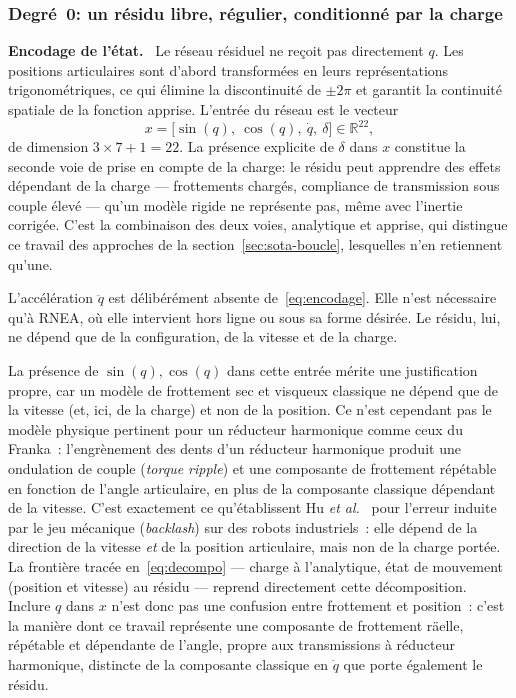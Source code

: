 \documentclass[a4paper, oneside]{article}
\newcommand{\parag}[1]{%
    \par\medskip\noindent\textbf{#1}\ \ignorespaces%
}
\newcommand{\q}{\ensuremath{q}}
\newcommand{\qd}{\ensuremath{\dot{q}}}
\newcommand{\qdd}{\ensuremath{\ddot{q}}}
\newcommand{\Rset}{\ensuremath{\mathbb{R}}}
\begin{document}
\subsubsection{Degré~0: un résidu libre, régulier, conditionné par la charge}
\label{sec:degre0}

\parag{Encodage de l'état.} Le réseau résiduel ne reçoit pas directement
$\q$. Les positions articulaires sont d'abord transformées en leurs
représentations trigonométriques, ce qui élimine la discontinuité de
$\pm 2\pi$ et garantit la continuité spatiale de la fonction apprise. L'entrée
du réseau est le vecteur
%
\begin{equation}
    x = \bigl[\sin(\q),\ \cos(\q),\ \qd,\ \delta\bigr] \in \Rset^{22},
    \label{eq:encodage}
\end{equation}
%
de dimension $3\times 7 + 1 = 22$. La présence explicite de $\delta$ dans $x$
constitue la seconde voie de prise en compte de la charge: le résidu peut
apprendre des effets dépendant de la charge — frottements chargés, compliance de
transmission sous couple élevé — qu'un modèle rigide ne représente pas, même
avec l'inertie corrigée. C'est la combinaison des deux voies, analytique et
apprise, qui distingue ce travail des approches de la
section~\ref{sec:sota-boucle}, lesquelles n'en retiennent qu'une.

L'accélération $\qdd$ est délibérément absente de~\eqref{eq:encodage}. Elle
n'est nécessaire qu'à RNEA, où elle intervient hors ligne ou sous sa forme
désirée. Le résidu, lui, ne dépend que de la configuration, de la vitesse et de
la charge.

La présence de $\sin(\q), \cos(\q)$ dans cette entrée mérite une justification
propre, car un modèle de frottement sec et visqueux classique ne dépend que de
la vitesse (et, ici, de la charge) et non de la position. Ce n'est cependant
pas le modèle physique pertinent pour un réducteur harmonique comme ceux du
Franka~: l'engrènement des dents d'un réducteur harmonique produit une
ondulation de couple (\emph{torque ripple}) et une composante de frottement
répétable en fonction de l'angle articulaire, en plus de la composante
classique dépendant de la vitesse. C'est exactement ce qu'établissent
Hu \emph{et al.}~\cite{hu2026} pour l'erreur induite par le jeu mécanique
(\emph{backlash}) sur des robots industriels~: elle dépend de la direction de
la vitesse \emph{et} de la position articulaire, mais non de la charge portée.
La frontière tracée en~\eqref{eq:decompo} — charge à l'analytique, état de
mouvement (position et vitesse) au résidu — reprend directement cette
décomposition. Inclure $\q$ dans $x$ n'est donc pas une confusion entre
frottement et position~: c'est la manière dont ce travail représente une
composante de frottement räelle, répétable et dépendante de l'angle, propre
aux transmissions à réducteur harmonique, distincte de la composante
classique en $\qd$ que porte également le résidu.
\end{document}
